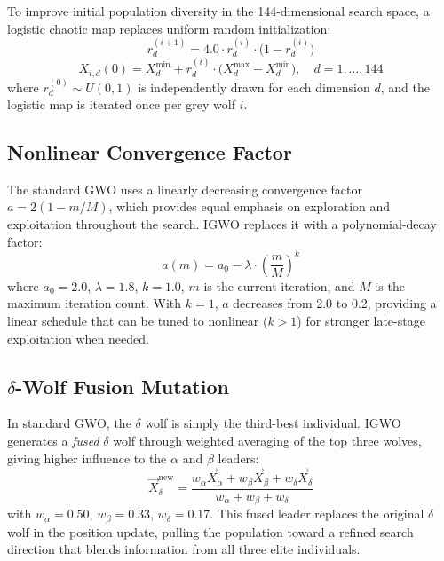 To improve initial population diversity in the 144-dimensional search space, a logistic chaotic map replaces uniform random initialization:
\begin{equation}
r_{d}^{(i+1)} = 4.0 \cdot r_{d}^{(i)} \cdot \bigl(1 - r_{d}^{(i)}\bigr)
\label{eq:logistic_init}
\end{equation}
\begin{equation}
X_{i,d}(0) = X_d^{\min} + r_{d}^{(i)} \cdot \bigl(X_d^{\max} - X_d^{\min}\bigr),\quad d=1,\ldots,144
\label{eq:init_position}
\end{equation}
where $r_d^{(0)}\sim U(0,1)$ is independently drawn for each dimension $d$, and the logistic map is iterated once per grey wolf $i$.

\subsection{Nonlinear Convergence Factor}

The standard GWO uses a linearly decreasing convergence factor $a = 2(1 - m/M)$, which provides equal emphasis on exploration and exploitation throughout the search. IGWO replaces it with a polynomial-decay factor:
\begin{equation}
a(m) = a_0 - \lambda \cdot \left(\frac{m}{M}\right)^k
\label{eq:nonlinear_a}
\end{equation}
where $a_0=2.0$, $\lambda=1.8$, $k=1.0$, $m$ is the current iteration, and $M$ is the maximum iteration count. With $k=1$, $a$ decreases from 2.0 to 0.2, providing a linear schedule that can be tuned to nonlinear ($k>1$) for stronger late-stage exploitation when needed.

\subsection{$\delta$-Wolf Fusion Mutation}

In standard GWO, the $\delta$ wolf is simply the third-best individual. IGWO generates a \textit{fused} $\delta$ wolf through weighted averaging of the top three wolves, giving higher influence to the $\alpha$ and $\beta$ leaders:
\begin{equation}
\vec{X}_{\delta}^{\text{new}} = \frac{w_\alpha \vec{X}_\alpha + w_\beta \vec{X}_\beta + w_\delta \vec{X}_\delta}{w_\alpha + w_\beta + w_\delta}
\label{eq:delta_fusion}
\end{equation}
with $w_\alpha = 0.50$, $w_\beta = 0.33$, $w_\delta = 0.17$. This fused leader replaces the original $\delta$ wolf in the position update, pulling the population toward a refined search direction that blends information from all three elite individuals.


